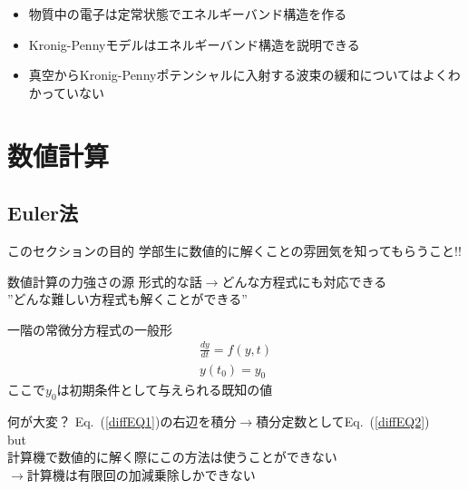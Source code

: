 \documentclass[unicode, 12pt, aspectratio=169]{beamer}
\newcommand{\eref}[1]{Eq.~(\ref{#1})}
\begin{document}
\begin{frame}
      \begin{itemize}
        \item 物質中の電子は定常状態でエネルギーバンド構造を作る
        \item Kronig-Pennyモデルはエネルギーバンド構造を説明できる
        \item 真空からKronig-Pennyポテンシャルに入射する波束の緩和についてはよくわかっていない
      \end{itemize}
\end{frame}

\section{数値計算}
\subsection{Euler法}
\frame{\insertsubsection}

\begin{frame}{このセクションの目的}
    学部生に数値的に解くことの雰囲気を知ってもらうこと!!
    \begin{alertblock}{数値計算の力強さの源}
     形式的な話$\rightarrow$どんな方程式にも対応できる\\
      \alert{”どんな難しい方程式も解くことができる”}\\
    \end{alertblock}
\end{frame}

\begin{frame}
  \begin{block}{一階の常微分方程式の一般形}
    \begin{align}
      \frac{dy}{dt} = f(y,t)\label{diffEQ1}\\
      y(t_0) = y_0\label{diffEQ2}
    \end{align}
    ここで$y_0$は初期条件として与えられる既知の値
  \end{block}
\end{frame}

\begin{frame}
  \begin{block}{何が大変？}
    \eref{diffEQ1}の右辺を積分$\rightarrow$積分定数として\eref{diffEQ2}\\
    \alert{but}\\
    計算機で数値的に解く際にこの方法は使うことができない\\
    $\rightarrow$計算機は有限回の加減乗除しかできない
  \end{block}
\end{frame}
\end{document}
